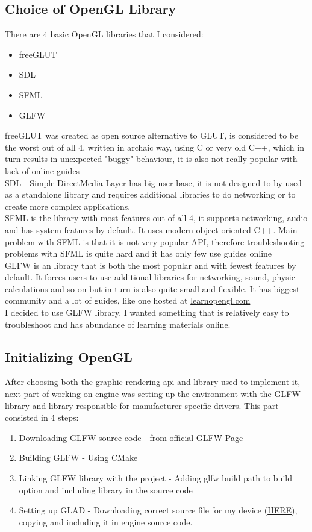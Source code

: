 \documentclass[12pt]{article}
\begin{document}
\subsection{Choice of OpenGL Library}
There are 4 basic OpenGL libraries that I considered:
\begin{itemize}
    \item freeGLUT
    \item SDL 
    \item SFML 
    \item GLFW
\end{itemize}
freeGLUT was created as open source alternative to GLUT, 
is considered to be the worst out of all 4, 
written in archaic way, using C or very old C++, 
which in turn results in unexpected "buggy" behaviour,
it is also not really popular with lack of online guides \\
SDL - Simple DirectMedia Layer has big user base, 
it is not designed to by used as a standalone 
library and requires additional libraries to do networking 
or to create more complex applications. \\
SFML is the library with most features out of all 4, 
it supports networking, audio and has system features by 
default. It uses modern object oriented C++. 
Main problem with SFML is that it is not very popular API,
therefore troubleshooting problems with SFML is quite hard and
it has only few use guides online \\
GLFW is an library that is both the most popular and with fewest features by default. 
It forces users to use additional libraries for networking, 
sound, physic calculations and so on but in turn is also 
quite small and flexible. It has biggest community and a 
lot of guides, like one hosted at 
\href{learnopengl.com}{learnopengl.com} \\
I decided to use GLFW library. I wanted something that is 
relatively easy to troubleshoot and has abundance of 
learning materials online. 

\subsection{Initializing OpenGL}
After choosing both the graphic rendering api and library used to implement it, next part of working on engine was setting up the environment with the GLFW library and library responsible for manufacturer specific drivers. This part consisted in 4 steps:
\begin{enumerate}
    \item Downloading GLFW source code - from official  \href{https://www.glfw.org/download.html}{GLFW Page}
    \item Building GLFW - Using CMake 
    \item Linking GLFW library with the project - Adding glfw build path to build option and including library in the source code
    \item Setting up GLAD - Downloading correct source file for my device (\href{https://glad.dav1d.de/}{HERE}), copying and including it in engine source code. 
\end{enumerate}
\end{document}
